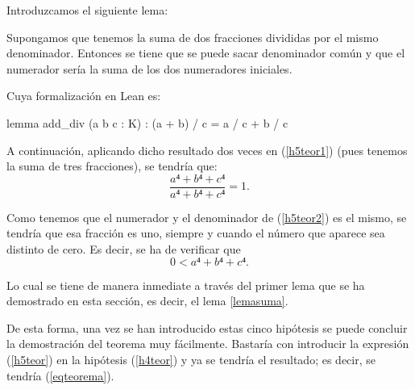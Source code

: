 \begin{demostracion}
\begin{itemize}
    Introduzcamos el siguiente lema:
    \begin{lema}
      Supongamos que tenemos la suma de dos fracciones divididas por el
      mismo denominador. Entonces se tiene que se puede sacar
      denominador común y que el numerador sería la suma de los dos
      numeradores iniciales.
    \end{lema}

    Cuya formalización en Lean es:
    \begin{leancode}
    lemma add_div (a b c : K) : (a + b) / c = a / c + b / c
    \end{leancode}

    A continuación, aplicando dicho resultado dos veces en
    (\ref{h5teor1}) (pues tenemos la suma de tres fracciones), se
    tendría que:
    \begin{equation}\label{h5teor2}
      \frac{a⁴+b⁴+c⁴}{a⁴+b⁴+c⁴}=1.
    \end{equation}

    Como tenemos que el numerador y el denominador de (\ref{h5teor2}) es
    el mismo, se tendría que esa fracción es uno, siempre y cuando el
    número que aparece sea distinto de cero. Es decir, se ha de
    verificar que
    \begin{equation}
      0 < a⁴+b⁴+c⁴.
    \end{equation}

    Lo cual se tiene de manera inmediate a través del primer lema que
    se ha demostrado en esta sección, es decir, el lema \ref{lemasuma}.
  \end{itemize}

  De esta forma, una vez se han introducido estas cinco hipótesis se
  puede concluir la demostración del teorema muy fácilmente. Bastaría
  con introducir la expresión (\ref{h5teor}) en la hipótesis
  (\ref{h4teor}) y ya se tendría el resultado; es decir, se tendría
  (\ref{eqteorema}).
\end{demostracion}

